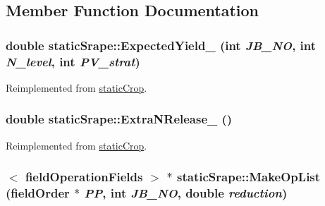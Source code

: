 \subsection{Member Function Documentation}
\hypertarget{classstatic_srape_af0a091d0bfdacd5ff9dafb1a4f3fa062}{
\subsubsection[{ExpectedYield\_\-}]{\setlength{\rightskip}{0pt plus 5cm}double staticSrape::ExpectedYield\_\- (int {\em JB\_\-NO}, \/  int {\em N\_\-level}, \/  int {\em PV\_\-strat})}}
\label{classstatic_srape_af0a091d0bfdacd5ff9dafb1a4f3fa062}


Reimplemented from \hyperlink{classstatic_crop_ab7b9a8ecb31b10c4dcf44f13000e2f8c}{staticCrop}.\hypertarget{classstatic_srape_a2fbf9178adfebf89d2699559a9b7fd42}{
\subsubsection[{ExtraNRelease\_\-}]{\setlength{\rightskip}{0pt plus 5cm}double staticSrape::ExtraNRelease\_\- ()}}
\label{classstatic_srape_a2fbf9178adfebf89d2699559a9b7fd42}


Reimplemented from \hyperlink{classstatic_crop_afe0cb8a7831afa941a37338f05227d67}{staticCrop}.\hypertarget{classstatic_srape_a7db3ea6c58117111c9d21a07a6b83a00}{
\subsubsection[{MakeOpList}]{$<$ {\bf fieldOperationFields} $>$ $\ast$ staticSrape::MakeOpList ({\bf fieldOrder} $\ast$ {\em PP}, \/  int {\em JB\_\-NO}, \/  double {\em reduction})}}
\label{classstatic_srape_a7db3ea6c58117111c9d21a07a6b83a00}


